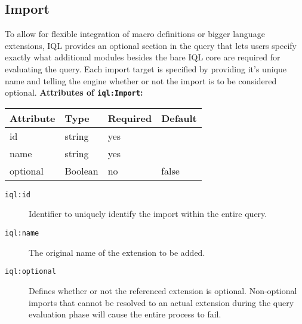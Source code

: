 \documentclass[11pt]{article}
\newcommand{\iql}{IQL\xspace}
\newcommand{\iqlns}{iql:}
\newcommand{\iqlType}[1]{\texttt{\iqlns#1}}
\newcommand{\desc}[1]{\noindent#1\newline\medskip}
\newenvironment{attributes}[1]{
\noindent\textbf{Attributes of #1:}\newline\medskip
\begin{tabular}{|p{0.3\textwidth}|p{0.20\textwidth}|p{0.20\textwidth}|p{0.17\textwidth}|}
	\hline
	\textbf{Attribute} & \textbf{Type} & \textbf{Required} & \textbf{Default} \\ 
	\hline
	\hline
}{
\end{tabular}
}
\newcommand{\attribute}[4]{
	#1 & #2 & #3 & #4 \\
	\hline
}
\begin{document}
\subsection{Import}
\label{sec:json-ld-import}
\desc{To allow for flexible integration of macro definitions or bigger language extensions, \iql provides an optional section in the query that lets users specify exactly what additional modules besides the bare \iql core are required for evaluating the query. Each import target is specified by providing it's unique name and telling the engine whether or not the import is to be considered optional.}
\begin{attributes}{\iqlType{Import}}
	\attribute{id}{string}{yes}{}
	\attribute{name}{string}{yes}{}
	\attribute{optional}{Boolean}{no}{false}
\end{attributes}
\begin{description}
	\item[\iqlType{id}] Identifier to uniquely identify the import within the entire query.
	\item[\iqlType{name}] The original name of the extension to be added.
	\item[\iqlType{optional}] Defines whether or not the referenced extension is optional. 	Non-optional imports that cannot be resolved to an actual extension during the query evaluation phase will cause the entire process to fail.
\end{description}

\end{document}
